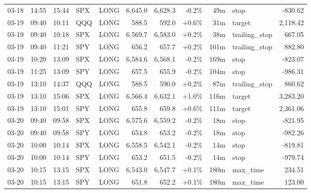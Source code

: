 \documentclass[11pt,a4paper,twoside]{article}
\begin{document}
\begin{center}
\begin{longtable}{>{\color{txtmain}}l l l l l r r r r >{\color{txtmain}}l r}
03-18 & 14:55 & 15:44 & SPX & LONG & 6,645.0 & 6,628.3 & \textcolor{lossred}{-0.2\%} & 49m & stop & \textcolor{lossred}{-830.62} \\
03-19 & 09:40 & 10:11 & QQQ & LONG & 588.5 & 592.0 & \textcolor{wingreen}{+0.6\%} & 31m & target & \textcolor{wingreen}{2,118.42} \\
03-19 & 09:40 & 10:18 & SPX & LONG & 6,569.7 & 6,583.0 & \textcolor{wingreen}{+0.2\%} & 38m & trailing\_stop & \textcolor{wingreen}{667.05} \\
03-19 & 09:40 & 11:21 & SPY & LONG & 656.2 & 657.7 & \textcolor{wingreen}{+0.2\%} & 101m & trailing\_stop & \textcolor{wingreen}{882.80} \\
03-19 & 10:20 & 13:09 & SPX & LONG & 6,584.6 & 6,568.1 & \textcolor{lossred}{-0.2\%} & 169m & stop & \textcolor{lossred}{-823.07} \\
03-19 & 11:25 & 13:09 & SPY & LONG & 657.5 & 655.9 & \textcolor{lossred}{-0.2\%} & 104m & stop & \textcolor{lossred}{-986.31} \\
03-19 & 13:10 & 14:37 & QQQ & LONG & 588.5 & 590.0 & \textcolor{wingreen}{+0.2\%} & 87m & trailing\_stop & \textcolor{wingreen}{860.62} \\
03-19 & 13:10 & 15:06 & SPX & LONG & 6,566.4 & 6,632.1 & \textcolor{wingreen}{+1.0\%} & 116m & target & \textcolor{wingreen}{3,283.20} \\
03-19 & 13:10 & 15:01 & SPY & LONG & 655.8 & 659.8 & \textcolor{wingreen}{+0.6\%} & 111m & target & \textcolor{wingreen}{2,361.06} \\
03-20 & 09:40 & 09:58 & SPX & LONG & 6,575.6 & 6,559.2 & \textcolor{lossred}{-0.2\%} & 18m & stop & \textcolor{lossred}{-821.95} \\
03-20 & 09:40 & 09:58 & SPY & LONG & 654.8 & 653.2 & \textcolor{lossred}{-0.2\%} & 18m & stop & \textcolor{lossred}{-982.26} \\
03-20 & 10:00 & 10:14 & SPX & LONG & 6,558.5 & 6,542.1 & \textcolor{lossred}{-0.2\%} & 14m & stop & \textcolor{lossred}{-819.81} \\
03-20 & 10:00 & 10:14 & SPY & LONG & 653.2 & 651.5 & \textcolor{lossred}{-0.2\%} & 14m & stop & \textcolor{lossred}{-979.74} \\
03-20 & 10:15 & 13:15 & SPX & LONG & 6,543.0 & 6,547.7 & \textcolor{wingreen}{+0.1\%} & 180m & max\_time & \textcolor{wingreen}{234.51} \\
03-20 & 10:15 & 13:15 & SPY & LONG & 651.8 & 652.2 & \textcolor{wingreen}{+0.1\%} & 180m & max\_time & \textcolor{wingreen}{123.00} \\

\end{longtable}
\end{center}
\end{document}
